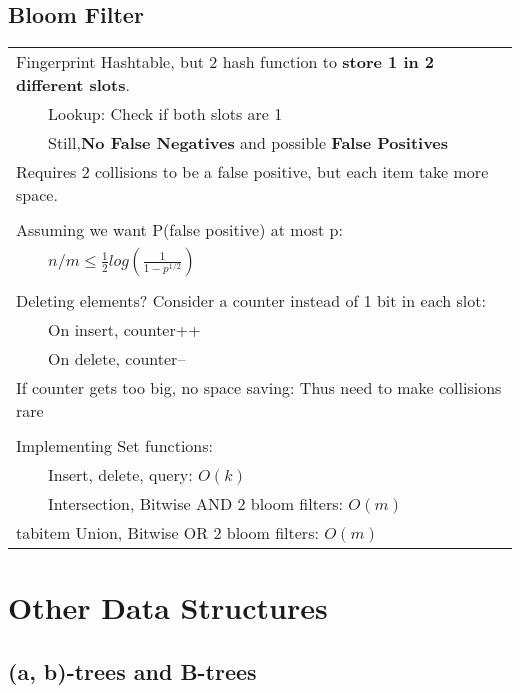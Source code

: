\documentclass{article}
\newcommand{\tabitem}{~~\llap{\textbullet}~~}
\begin{document}
    \subsection{Bloom Filter}

    \begin{tabular}{l}
        Fingerprint Hashtable, but 2 hash function to \textbf{store 1 in 2 different slots}.\\
        \tabitem Lookup: Check if both slots are 1\\
        \tabitem Still,\textbf{No False Negatives} and possible \textbf{False Positives}\\
        Requires 2 collisions to be a false positive, but each item take more space.\\\\
        Assuming we want P(false positive) at most p:\\
        \tabitem $n/m \leq \frac{1}{2}log(\frac{1}{1-p^{1/2}})$\\\\
        Deleting elements? Consider a counter instead of 1 bit in each slot:\\
        \tabitem On insert, counter++\\
        \tabitem On delete, counter--\\
        If counter gets too big, no space saving: Thus need to make collisions rare\\\\
        Implementing Set functions:\\
        \tabitem Insert, delete, query: $O(k)$\\
        \tabitem Intersection, Bitwise AND 2 bloom filters: $O(m)$\\
        tabitem Union, Bitwise OR 2 bloom filters: $O(m)$\\
    \end{tabular}

    \pagebreak

    \section{Other Data Structures}

    \subsection{(a, b)-trees and B-trees}
\end{document}
